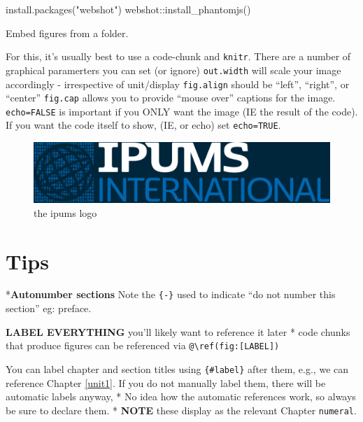 \documentclass[
]{book}
\newenvironment{Shaded}{\begin{snugshade}}{\end{snugshade}}
\newcommand{\FunctionTok}[1]{\textcolor[rgb]{0.00,0.00,0.00}{#1}}
\newcommand{\NormalTok}[1]{#1}
\newcommand{\SpecialCharTok}[1]{\textcolor[rgb]{0.00,0.00,0.00}{#1}}
\newcommand{\StringTok}[1]{\textcolor[rgb]{0.31,0.60,0.02}{#1}}
\begin{document}
\begin{Shaded}
\begin{Highlighting}[]
\FunctionTok{install.packages}\NormalTok{(}\StringTok{"webshot"}\NormalTok{)}
\NormalTok{webshot}\SpecialCharTok{::}\FunctionTok{install\_phantomjs}\NormalTok{()}
\end{Highlighting}
\end{Shaded}

Embed figures from a folder.

For this, it's usually best to use a code-chunk and \texttt{knitr}. There are a number of graphical paramerters you can set (or ignore)
\texttt{out.width} will scale your image accordingly - irrespective of unit/display
\texttt{fig.align} should be ``left'', ``right'', or ``center''
\texttt{fig.cap} allows you to provide ``mouse over'' captions for the image.
\texttt{echo=FALSE} is important if you ONLY want the image (IE the result of the code). If you want the code itself to show, (IE, or echo) set \texttt{echo=TRUE}.

\begin{figure}

{\centering \includegraphics[width=0.5\linewidth]{imgs/ipums_i_logo} 

}

\caption{the ipums logo}\label{fig:unnamed-chunk-43}
\end{figure}

\hypertarget{tips}{%
\section{Tips}\label{tips}}

*\textbf{Autonumber sections} Note the \texttt{\{-\}} used to indicate ``do not number this section'' eg: preface.

\textbf{LABEL EVERYTHING} you'll likely want to reference it later
* code chunks that produce figures can be referenced via \texttt{@\textbackslash{}ref(fig:{[}LABEL{]})}

You can label chapter and section titles using \texttt{\{\#label\}} after them, e.g., we can reference Chapter \ref{unit1}. If you do not manually label them, there will be automatic labels anyway,
* No idea how the automatic references work, so always be sure to declare them.
* \textbf{NOTE} these display as the relevant Chapter \texttt{numeral}.
\end{document}
